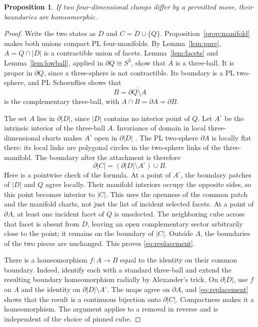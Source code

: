 \documentclass[11pt]{article}
\newtheorem{proposition}[theorem]{Proposition}
\theoremstyle{remark}
\newcommand{\bd}{\partial}
\begin{document}
\begin{proposition}\label{prop:boundary}
If two four-dimensional clumps differ by a permitted move, their
boundaries are homeomorphic.
\end{proposition}

\begin{proof}
Write the two states as $D$ and $C=D\cup\{Q\}$.
Proposition~\ref{prop:manifold} makes both unions compact PL four-manifolds.
By Lemma~\ref{lem:pure}, $A=Q\cap|D|$ is a contractible union of facets.
Lemma~\ref{lem:facets} and Lemma~\ref{lem:lowball}, applied in
$\bd Q\cong S^3$, show that $A$ is a three-ball. It is proper in
$\bd Q$, since a three-sphere is not contractible. Its boundary is a PL
two-sphere, and PL Schoenflies shows that
\[
 B=\overline{\bd Q\setminus A}
\]
is the complementary three-ball, with $A\cap B=\bd A=\bd B$.

The set $A$ lies in $\bd|D|$, since $|D|$ contains no interior point of
$Q$. Let $A^\circ$ be the intrinsic interior of the three-ball $A$.
Invariance of domain in local three-dimensional charts makes $A^\circ$
open in $\bd|D|$ \cite[Theorem~2B.3, p.~172]{Hatcher}.
The PL two-sphere $\bd A$ is locally flat there: its local links are
polygonal circles in the two-sphere links of the three-manifold.
The boundary after the attachment is therefore
\begin{equation}\label{eq:replacement}
 \bd|C|=(\bd|D|\setminus A^\circ)\cup B.
\end{equation}
Here is a pointwise check of the formula. At a point of $A^\circ$, the
boundary patches of $|D|$ and $Q$ agree locally. Their manifold interiors
occupy the opposite sides, so this point becomes interior to $|C|$.
This uses the openness of the common patch and the manifold charts, not
just the list of incident selected facets. At a point of $\bd A$, at
least one incident facet of $Q$ is unselected. The neighboring cube
across that facet is absent from $D$, leaving an open complementary
sector arbitrarily close to the point; it remains on the boundary of
$|C|$. Outside $A$, the boundaries of the two pieces are unchanged.
This proves \eqref{eq:replacement}.

There is a homeomorphism $f:A\longrightarrow B$ equal to the identity
on their common boundary. Indeed, identify each with a standard
three-ball and extend the resulting boundary homeomorphism radially
by Alexander's trick. On $\bd|D|$, use $f$ on $A$ and the identity on
$\bd|D|\setminus A^\circ$. The maps agree on $\bd A$, and
\eqref{eq:replacement} shows that the result is a continuous bijection
onto $\bd|C|$. Compactness makes it a homeomorphism. The argument applies
to a removal in reverse and is independent of the choice of pinned cube.
\end{proof}
\end{document}
